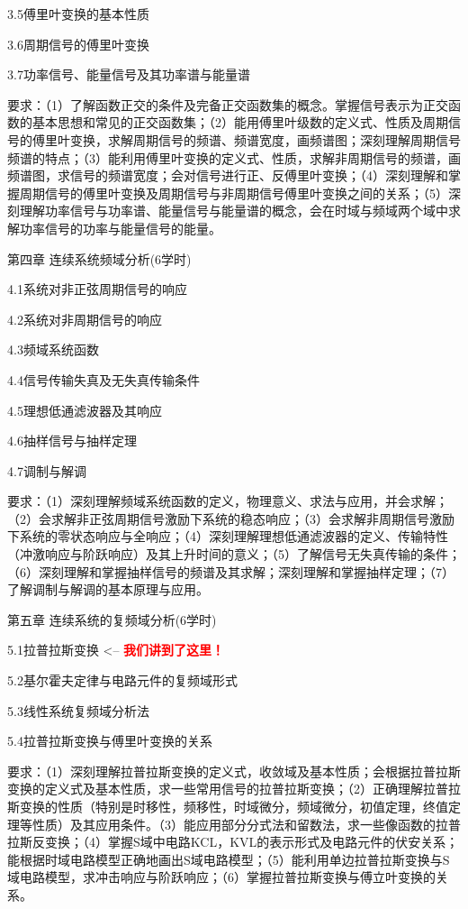 \documentclass[letterpaper]{article}
\begin{document}
\quad\quad 3.5傅里叶变换的基本性质\par
\quad\quad 3.6周期信号的傅里叶变换\par
\quad\quad 3.7功率信号、能量信号及其功率谱与能量谱\par
\quad\quad 要求：（1）了解函数正交的条件及完备正交函数集的概念。掌握信号表示为正交函数的基本思想和常见的正交函数集；（2）能用傅里叶级数的定义式、性质及周期信号的傅里叶变换，求解周期信号的频谱、频谱宽度，画频谱图；深刻理解周期信号频谱的特点；（3）能利用傅里叶变换的定义式、性质，求解非周期信号的频谱，画频谱图，求信号的频谱宽度；会对信号进行正、反傅里叶变换；（4）深刻理解和掌握周期信号的傅里叶变换及周期信号与非周期信号傅里叶变换之间的关系；（5）深刻理解功率信号与功率谱、能量信号与能量谱的概念，会在时域与频域两个域中求解功率信号的功率与能量信号的能量。\par
\vspace{1em}
第四章 \quad\quad 连续系统频域分析(6学时)\par
\quad\quad 4.1系统对非正弦周期信号的响应\par
\quad\quad 4.2系统对非周期信号的响应\par
\quad\quad 4.3频域系统函数\par
\quad\quad 4.4信号传输失真及无失真传输条件\par
\quad\quad 4.5理想低通滤波器及其响应\par
\quad\quad 4.6抽样信号与抽样定理\par
\quad\quad 4.7调制与解调\par
\quad\quad 要求：（1）深刻理解频域系统函数的定义，物理意义、求法与应用，并会求解；（2）会求解非正弦周期信号激励下系统的稳态响应；（3）会求解非周期信号激励下系统的零状态响应与全响应；（4）深刻理解理想低通滤波器的定义、传输特性（冲激响应与阶跃响应）及其上升时间的意义；（5）了解信号无失真传输的条件；（6）深刻理解和掌握抽样信号的频谱及其求解；深刻理解和掌握抽样定理；（7）了解调制与解调的基本原理与应用。\par
\vspace{1em}
第五章 \quad 连续系统的复频域分析(6学时)\par
\quad\quad 5.1拉普拉斯变换  <-- \textcolor{red}{\textbf{我们讲到了这里！}}\par
\quad\quad 5.2基尔霍夫定律与电路元件的复频域形式\par
\quad\quad 5.3线性系统复频域分析法\par
\quad\quad 5.4拉普拉斯变换与傅里叶变换的关系\par
\quad\quad 要求：（1）深刻理解拉普拉斯变换的定义式，收敛域及基本性质；会根据拉普拉斯变换的定义式及基本性质，求一些常用信号的拉普拉斯变换；（2）正确理解拉普拉斯变换的性质（特别是时移性，频移性，时域微分，频域微分，初值定理，终值定理等性质）及其应用条件。（3）能应用部分分式法和留数法，求一些像函数的拉普拉斯反变换；（4）掌握S域中电路KCL，KVL的表示形式及电路元件的伏安关系；能根据时域电路模型正确地画出S域电路模型；（5）能利用单边拉普拉斯变换与S域电路模型，求冲击响应与阶跃响应；（6）掌握拉普拉斯变换与傅立叶变换的关系。\par
\end{document}
